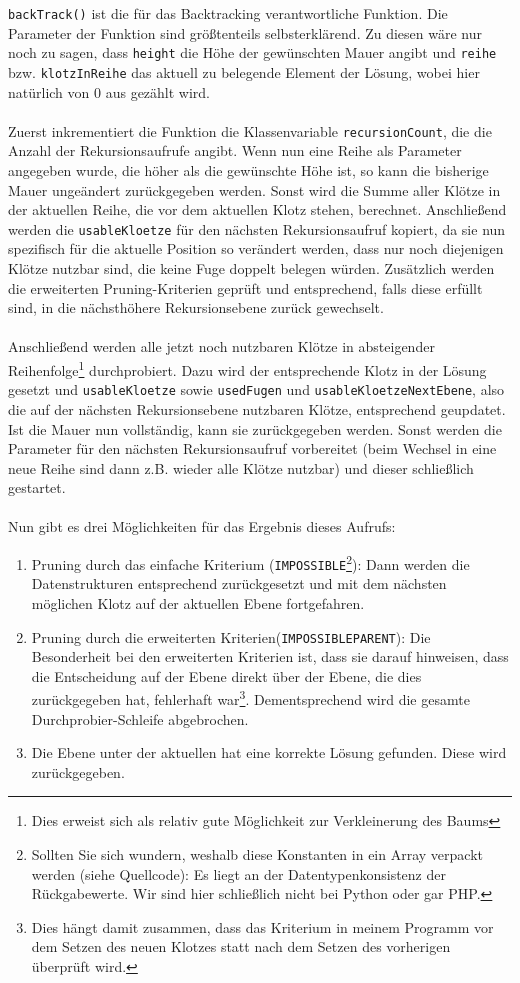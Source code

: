 \documentclass[a4paper, notitlepage, 12pt]{scrartcl}
\begin{document}
\texttt{backTrack()} ist die für das Backtracking verantwortliche Funktion. Die Parameter der Funktion sind größtenteils selbsterklärend. Zu diesen wäre nur noch zu sagen, dass \texttt{height} die Höhe der gewünschten Mauer angibt und \texttt{reihe} bzw. \texttt{klotzInReihe} das aktuell zu belegende Element der Lösung, wobei hier natürlich von 0 aus gezählt wird.
\\ \\
Zuerst inkrementiert die Funktion die Klassenvariable \texttt{recursionCount}, die die Anzahl der Rekursionsaufrufe angibt. Wenn nun eine Reihe als Parameter angegeben wurde, die höher als die gewünschte Höhe ist, so kann die bisherige Mauer ungeändert zurückgegeben werden. Sonst wird die Summe aller Klötze in der aktuellen Reihe, die vor dem aktuellen Klotz stehen, berechnet. Anschließend werden die \texttt{usableKloetze} für den nächsten Rekursionsaufruf kopiert, da sie nun spezifisch für die aktuelle Position so verändert werden, dass nur noch diejenigen Klötze nutzbar sind, die keine Fuge doppelt belegen würden. Zusätzlich werden die erweiterten Pruning-Kriterien geprüft und entsprechend, falls diese erfüllt sind, in die nächsthöhere Rekursionsebene zurück gewechselt.
\\ \\
Anschließend werden alle jetzt noch nutzbaren Klötze in absteigender Reihenfolge\footnote{Dies erweist sich als relativ gute Möglichkeit zur Verkleinerung des Baums} durchprobiert. Dazu wird der entsprechende Klotz in der Lösung gesetzt und \texttt{usableKloetze} sowie \texttt{usedFugen} und \texttt{usableKloetzeNextEbene}, also die auf der nächsten Rekursionsebene nutzbaren Klötze, entsprechend geupdatet. Ist die Mauer nun vollständig, kann sie zurückgegeben werden. Sonst werden die Parameter für den nächsten Rekursionsaufruf vorbereitet (beim Wechsel in eine neue Reihe sind dann z.B. wieder alle Klötze nutzbar) und dieser schließlich gestartet.
\\ \\
Nun gibt es drei Möglichkeiten für das Ergebnis dieses Aufrufs:
\begin{enumerate}
\item Pruning durch das einfache Kriterium (\texttt{IMPOSSIBLE}\footnote{Sollten Sie sich wundern, weshalb diese Konstanten in ein Array verpackt werden (siehe Quellcode): Es liegt an der Datentypenkonsistenz der Rückgabewerte. Wir sind hier schließlich nicht bei Python oder gar PHP.}): Dann werden die Datenstrukturen entsprechend zurückgesetzt und mit dem nächsten möglichen Klotz auf der aktuellen Ebene fortgefahren.
\item Pruning durch die erweiterten Kriterien(\texttt{IMPOSSIBLEPARENT}): Die Besonderheit bei den erweiterten Kriterien ist, dass sie darauf hinweisen, dass die Entscheidung auf der Ebene direkt über der Ebene, die dies zurückgegeben hat, fehlerhaft war\footnote{Dies hängt damit zusammen, dass das Kriterium in meinem Programm vor dem Setzen des neuen Klotzes statt nach dem Setzen des vorherigen überprüft wird.}. Dementsprechend wird die gesamte Durchprobier-Schleife abgebrochen.
\item Die Ebene unter der aktuellen hat eine korrekte Lösung gefunden. Diese wird zurückgegeben.
\end{enumerate}
\end{document}
